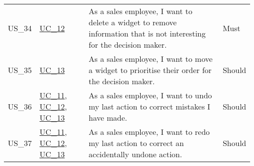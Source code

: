 \begin{footnotesize}
\begin{longtable}[L L L L]{ p{} p{} p{} p{} }
      \rowcolor{Gray}
      \hypertarget{Ref:US34}{US\_34} & \hyperlink{Ref:UC12}{UC\_12} & As a sales employee, I want to delete a \gls{widget} to remove information that is not interesting for the decision maker. & Must \\
      
      \hypertarget{Ref:US35}{US\_35} & \hyperlink{Ref:UC13}{UC\_13} \  & As a sales employee, I want to move a \gls{widget} to prioritise their order for the decision maker. & Should \\
      
      \rowcolor{Gray}
      \hypertarget{Ref:US36}{US\_36} & \hyperlink{Ref:UC11}{UC\_11}, \newline \hyperlink{Ref:UC12}{UC\_12}, \newline \hyperlink{Ref:UC13}{UC\_13} & As a sales employee, I want to undo my last action to correct mistakes I have made. & Should \\
      
      \hypertarget{Ref:US37}{US\_37} & \hyperlink{Ref:UC11}{UC\_11}, \newline \hyperlink{Ref:UC12}{UC\_12}, \newline \hyperlink{Ref:UC13}{UC\_13} & As a sales employee, I want to redo my last action to correct an accidentally undone action. & Should \\
      \bottomrule
    \end{longtable}
  \end{footnotesize}
  \rmfamily

